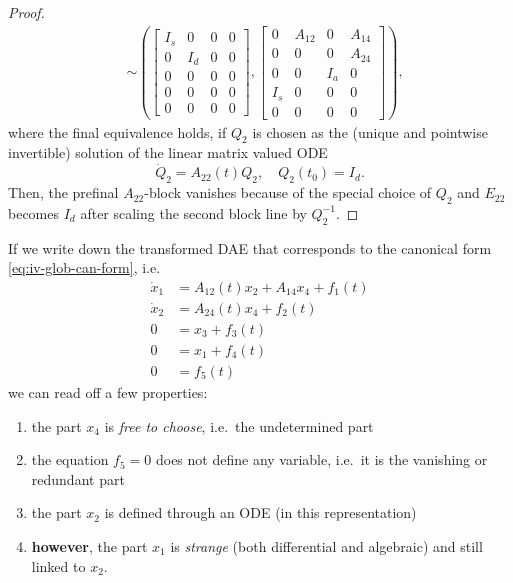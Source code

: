 \documentclass[]{book}
\providecommand{\tightlist}{%
  \setlength{\itemsep}{0pt}\setlength{\parskip}{0pt}}
\theoremstyle{definition}
\theoremstyle{definition}
\theoremstyle{definition}
\theoremstyle{definition}
\theoremstyle{remark}
\begin{document}
\begin{proof}
\begin{align*}
& \sim   
\left(\begin{bmatrix}
I_s & 0 & 0 & 0 \\
0 & I_d & 0 & 0 \\
0 & 0 & 0 & 0 \\
0 & 0 & 0 & 0 \\
0 & 0 & 0 & 0
\end{bmatrix},
\begin{bmatrix}
0 & A_{12} & 0 & A_{14}  \\
0 & 0 & 0 & A_{24}  \\
0 & 0 & I_a & 0 \\
I_s & 0 & 0 & 0 \\
0 & 0 & 0 & 0
\end{bmatrix}\right),
\end{align*}
where the final equivalence holds, if \(Q_2\) is chosen as the (unique and pointwise invertible) solution of the linear matrix valued ODE
\[
\dot Q_2 = A_{22}(t)Q_2 ,  \quad Q_2 (t_0 ) = I_d.
\]
Then, the prefinal \(A_{22}\)-block vanishes because of the special choice of \(Q_2\) and \(E_{22}\) becomes \(I_d\) after scaling the second block line by \(Q_2^{-1}\).
\end{proof}

If we write down the transformed DAE that corresponds to the canonical form \eqref{eq:iv-glob-can-form}, i.e.
\begin{align}
\dot x_1 &= A_{12}(t)x_2 + A_{14}x_4 + f_1(t) \label{eq:iv-gcf-spart-1} \\
\dot x_2 &= A_{24}(t)x_4 + f_2(t) \label{eq:iv-gcf-dpart}\\
0 &= x_3 + f_3(t) \\
0 &= x_1 + f_4(t) \label{eq:iv-gcf-spart-2} \\
0 &= f_5(t) 
\end{align}
we can read off a few properties:

\begin{enumerate}
\def\labelenumi{\arabic{enumi}.}
\tightlist
\item
  the part \(x_4\) is \emph{free to choose}, i.e.~the undetermined part
\item
  the equation \(f_5=0\) does not define any variable, i.e.~it is the vanishing or redundant part
\item
  the part \(x_2\) is defined through an ODE (in this representation)
\item
  \textbf{however}, the part \(x_1\) is \emph{strange} (both differential and algebraic) and still linked to \(x_2\).
\end{enumerate}
\end{document}
